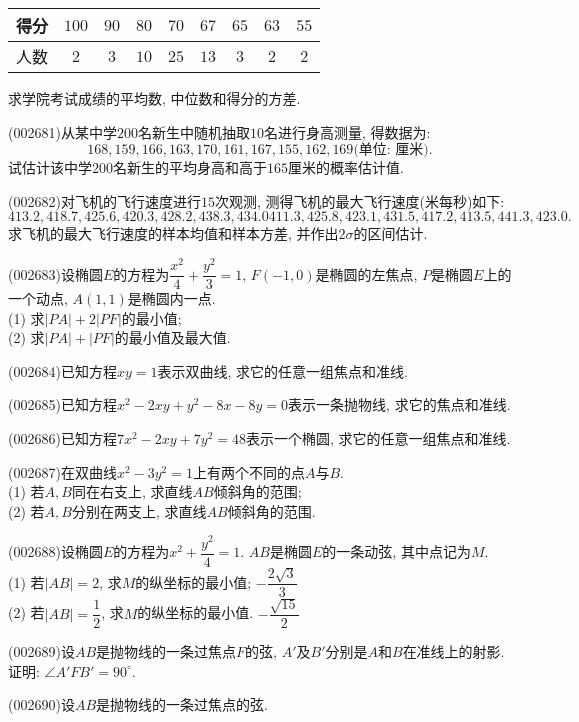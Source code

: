 \begin{center}
\begin{tabular}{|c|c|c|c|c|c|c|c|c|}
\hline
得分 & $100$ & $90$ & $80$ & $70$ & $67$ & $65$ & $63$ & $55$\\
\hline
人数 & $2$ & $3$ & $10$ & $25$ & $13$ & $3$ & $2$ & $2$\\
\hline
\end{tabular}
\end{center}
求学院考试成绩的平均数, 中位数和得分的方差.
\item (002681)从某中学$200$名新生中随机抽取$10$名进行身高测量, 得数据为: $$168,159,166,163,170,161,167,155,162,169\text{(单位: 厘米)}.$$ 试估计该中学$200$名新生的平均身高和高于$165$厘米的概率估计值.
\item (002682)对飞机的飞行速度进行$15$次观测, 测得飞机的最大飞行速度(米每秒)如下:
$$413.2, 418.7, 425.6, 420.3, 428.2, 438.3, 434.0 411.3, 425.8, 423.1, 431.5, 417.2, 413.5, 441.3, 423.0.$$
求飞机的最大飞行速度的样本均值和样本方差, 并作出$2\sigma$的区间估计.
\item (002683)设椭圆$E$的方程为$\dfrac{x^2}{4}+\dfrac{y^2}{3}=1$, $F(-1,0)$是椭圆的左焦点, $P$是椭圆$E$上的一个动点, $A(1,1)$是椭圆内一点.\\ 
(1) 求$|PA|+2|PF|$的最小值;\\ 
(2) 求$|PA|+|PF|$的最小值及最大值.
\item (002684)已知方程$xy=1$表示双曲线, 求它的任意一组焦点和准线.
\item (002685)已知方程$x^2-2xy+y^2-8x-8y=0$表示一条抛物线, 求它的焦点和准线.
\item (002686)已知方程$7x^2-2xy+7y^2=48$表示一个椭圆, 求它的任意一组焦点和准线.
\item (002687)在双曲线$x^2-3y^2=1$上有两个不同的点$A$与$B$.\\ 
(1) 若$A,B$同在右支上, 求直线$AB$倾斜角的范围;\\ 
(2) 若$A,B$分别在两支上, 求直线$AB$倾斜角的范围.
\item (002688)设椭圆$E$的方程为$x^2+\dfrac{y^2}{4}=1$. $AB$是椭圆$E$的一条动弦, 其中点记为$M$.\\ 
(1) 若$|AB|=2$, 求$M$的纵坐标的最小值; $-\dfrac{2\sqrt{3}}{3}$\\ 
(2) 若$|AB|=\dfrac{1}{2}$, 求$M$的纵坐标的最小值. $-\dfrac{\sqrt{15}}{2}$
\item (002689)设$AB$是抛物线的一条过焦点$F$的弦, $A'$及$B'$分别是$A$和$B$在准线上的射影. 证明: $\angle A'FB'=90^\circ$.
\item (002690)设$AB$是抛物线的一条过焦点的弦.\\ 
